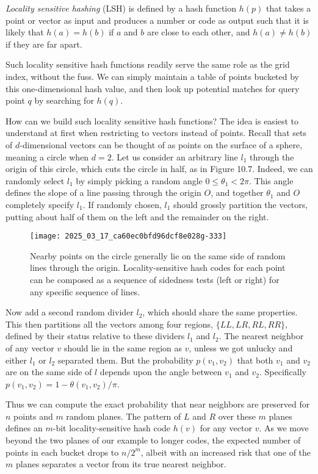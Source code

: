 \documentclass[10pt]{article}
\begin{document}
\textit{Locality sensitive hashing} (LSH) is defined by a hash function $h(p)$ that takes a point or vector as input and produces a number or code as output such that it is likely that $h(a) = h(b)$ if $a$ and $b$ are close to each other, and $h(a) \neq h(b)$ if they are far apart.

Such locality sensitive hash functions readily serve the same role as the grid index, without the fuss. We can simply maintain a table of points bucketed by this one-dimensional hash value, and then look up potential matches for query point $q$ by searching for $h(q)$.

How can we build such locality sensitive hash functions? The idea is easiest to understand at first when restricting to vectors instead of points. Recall that sets of $d$-dimensional vectors can be thought of as points on the surface of a sphere, meaning a circle when $d = 2$. Let us consider an arbitrary line $l_{1}$ through the origin of this circle, which cuts the circle in half, as in Figure 10.7. Indeed, we can randomly select $l_{1}$ by simply picking a random angle $0 \leq \theta_{1} < 2\pi$. This angle defines the slope of a line passing through the origin $O$, and together $\theta_{1}$ and $O$ completely specify $l_{1}$. If randomly chosen, $l_{1}$ should grossly partition the vectors, putting about half of them on the left and the remainder on the right.

\begin{figure}[htbp]
    \centering
    \texttt{[image: 2025\_03\_17\_ca60ec0bfd96dcf8e028g-333]}
    \caption{Nearby points on the circle generally lie on the same side of random lines through the origin. Locality-sensitive hash codes for each point can be composed as a sequence of sidedness tests (left or right) for any specific sequence of lines.}
\end{figure}

Now add a second random divider $l_{2}$, which should share the same properties. This then partitions all the vectors among four regions, $\{LL, LR, RL, RR\}$, defined by their status relative to these dividers $l_{1}$ and $l_{2}$. The nearest neighbor of any vector $v$ should lie in the same region as $v$, unless we got unlucky and either $l_{1}$ or $l_{2}$ separated them. But the probability $p(v_{1}, v_{2})$ that both $v_{1}$ and $v_{2}$ are on the same side of $l$ depends upon the angle between $v_{1}$ and $v_{2}$. Specifically $p(v_{1}, v_{2}) = 1 - \theta(v_{1}, v_{2}) / \pi$.

Thus we can compute the exact probability that near neighbors are preserved for $n$ points and $m$ random planes. The pattern of $L$ and $R$ over these $m$ planes defines an $m$-bit locality-sensitive hash code $h(v)$ for any vector $v$. As we move beyond the two planes of our example to longer codes, the expected number of points in each bucket drops to $n / 2^{m}$, albeit with an increased risk that one of the $m$ planes separates a vector from its true nearest neighbor.
\end{document}
